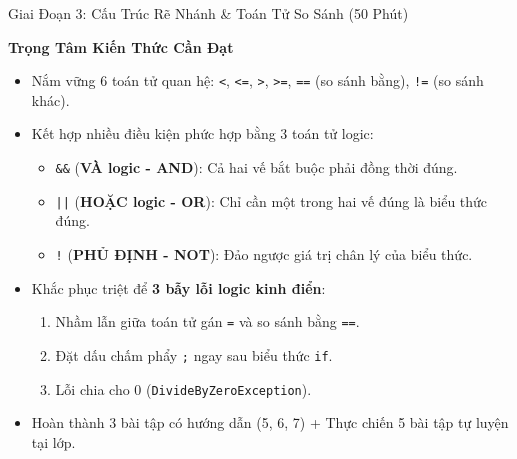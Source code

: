 \documentclass[aspectratio=169, 10pt]{beamer}
\begin{document}
\begin{frame}{Giai Đoạn 3: Cấu Trúc Rẽ Nhánh \& Toán Tử So Sánh (50 Phút)}
  \begin{block}{\textbf{Trọng Tâm Kiến Thức Cần Đạt}}
    \begin{itemize}
      \item Nắm vững 6 toán tử quan hệ: \texttt{<}, \texttt{<=}, \texttt{>}, \texttt{>=}, \texttt{==} (so sánh bằng), \texttt{!=} (so sánh khác).
      \item Kết hợp nhiều điều kiện phức hợp bằng 3 toán tử logic:
        \begin{itemize}
          \item \texttt{\&\&} (\textbf{VÀ logic - AND}): Cả hai vế bắt buộc phải đồng thời đúng.
          \item \texttt{||} (\textbf{HOẶC logic - OR}): Chỉ cần một trong hai vế đúng là biểu thức đúng.
          \item \texttt{!} (\textbf{PHỦ ĐỊNH - NOT}): Đảo ngược giá trị chân lý của biểu thức.
        \end{itemize}
      \item Khắc phục triệt để \textbf{3 bẫy lỗi logic kinh điển}:
        \begin{enumerate}
          \item Nhầm lẫn giữa toán tử gán \texttt{=} và so sánh bằng \texttt{==}.
          \item Đặt dấu chấm phẩy \texttt{;} ngay sau biểu thức \texttt{if}.
          \item Lỗi chia cho 0 (\texttt{DivideByZeroException}).
        \end{enumerate}
      \item Hoàn thành 3 bài tập có hướng dẫn (5, 6, 7) + Thực chiến 5 bài tập tự luyện tại lớp.
    \end{itemize}
  \end{block}
\end{frame}
\end{document}
